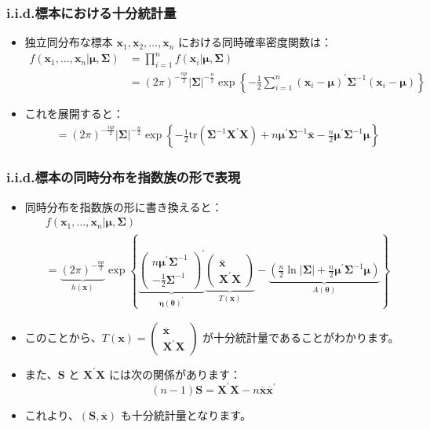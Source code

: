 \documentclass[aspectratio=169]{beamer}
\begin{document}
\begin{frame}
\frametitle{i.i.d.標本における十分統計量}
\begin{itemize}
    \item 独立同分布な標本 $\bm{x}_1, \bm{x}_2, \ldots, \bm{x}_n$ における同時確率密度関数は：
    \begin{align*}
    f(\bm{x}_1,\ldots,\bm{x}_n|\bm{\mu},\bm{\Sigma}) &= \prod_{i=1}^{n}f(\bm{x}_i|\bm{\mu},\bm{\Sigma}) \\
    &= (2\pi)^{-\frac{np}{2}}|\bm{\Sigma}|^{-\frac{n}{2}}\exp\left\{-\frac{1}{2}\sum_{i=1}^{n}(\bm{x}_i-\bm{\mu})^{\prime}\bm{\Sigma}^{-1}(\bm{x}_i-\bm{\mu})\right\}
    \end{align*}
    \item これを展開すると：
    \begin{align*}
    &= (2\pi)^{-\frac{np}{2}}|\bm{\Sigma}|^{-\frac{n}{2}}\exp\left\{-\frac{1}{2}\mathrm{tr}(\bm{\Sigma}^{-1}\bm{X}^{\prime}\bm{X})+n\bm{\mu}^{\prime}\bm{\Sigma}^{-1}\overline{\bm{x}}-\frac{n}{2}\bm{\mu}^{\prime}\bm{\Sigma}^{-1}\bm{\mu}\right\}
    \end{align*}
\end{itemize}
\end{frame}

\begin{frame}
\frametitle{i.i.d.標本の同時分布を指数族の形で表現}
\begin{itemize}
    \item 同時分布を指数族の形に書き換えると：
    \begin{align*}
    &f(\bm{x}_1,\ldots,\bm{x}_n|\bm{\mu},\bm{\Sigma}) \\
    &= \underbrace{(2\pi)^{-\frac{np}{2}}}_{h(\bm{x})}\exp\left\{\underbrace{\begin{pmatrix}n\bm{\mu}^{\prime}\bm{\Sigma}^{-1} \\ -\frac{1}{2}\bm{\Sigma}^{-1}\end{pmatrix}^{\prime}}_{\bm{\eta}(\bm{\theta})^{\prime}}\underbrace{\begin{pmatrix}\overline{\bm{x}} \\ \bm{X}^{\prime}\bm{X}\end{pmatrix}}_{T(\bm{x})}-\underbrace{\left(\frac{n}{2}\ln|\bm{\Sigma}|+\frac{n}{2}\bm{\mu}^{\prime}\bm{\Sigma}^{-1}\bm{\mu}\right)}_{A(\bm{\theta})}\right\}
    \end{align*}
    \item このことから、$T(\bm{x})=\begin{pmatrix}\overline{\bm{x}} \\ \bm{X}^{\prime}\bm{X}\end{pmatrix}$ が十分統計量であることがわかります。
    \item また、$\bm{S}$ と $\bm{X}^{\prime}\bm{X}$ には次の関係があります：
    \[
    (n-1)\bm{S} = \bm{X}^{\prime}\bm{X} - n\overline{\bm{x}}\overline{\bm{x}}^{\prime}
    \]
    \item これより、$(\bm{S},\overline{\bm{x}})$ も十分統計量となります。
\end{itemize}
\end{frame}
\end{document}
